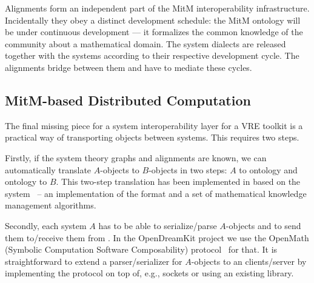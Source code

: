 Alignments form an independent part of the MitM interoperability infrastructure.
Incidentally they obey a distinct development schedule: the MitM ontology will be under continuous development --- it formalizes the common knowledge of the community about a mathematical domain.
The system dialects are released together with the systems according to their respective development cycle.
The alignments bridge between them and have to mediate these cycles.

\subsection{MitM-based Distributed Computation}\label{sec:mitm:comms}

The final missing piece for a system interoperability layer for a VRE toolkit is a practical way of transporting objects between systems.
This requires two steps.

Firstly, if the system theory graphs and alignments are known, we can automatically translate $A$-objects to $B$-objects in two steps: $A$ to ontology and ontology to $B$.
This two-step translation has been implemented in \cite{MueRoYuRa:abtafs17} based on the \MMT system~\cite{Rabe:MAGMS13,uniformal:on} -- an implementation of the \OMMT format and a set of mathematical knowledge management algorithms.

Secondly, each system $A$ has to be able to serialize/parse $A$-objects and to send them to/receive them from \MMT.
In the OpenDreamKit project we use the OpenMath \SCSCP (Symbolic Computation Software Composability) protocol~\cite{SCSCP-1.3} for that. 
It is straightforward to extend a parser/serializer for $A$-objects to an \SCSCP clients/server by implementing the \SCSCP protocol on top of, e.g., sockets or using an existing \SCSCP library. 


